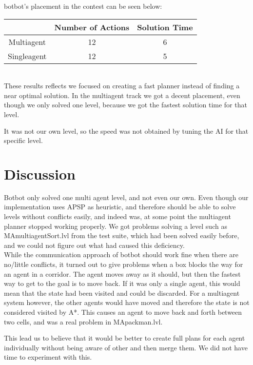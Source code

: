 \documentclass[letterpaper]{article}
\begin{document}
botbot's placement in the contest can be seen below:\\

\begin{tabular}{c|c|c}
 & Number of Actions & Solution Time \\
\hline
Multiagent & 12 & 6 \\
Singleagent & 12 & 5 \\
\end{tabular}\\

These results reflects we focused on creating a fast planner instead of finding
a near optimal solution. In the multiagent track we got a decent placement, even
though we only solved one level, because we got the fastest solution time for that level.

It was not our own level, so the speed was not obtained by tuning the AI for that
specific level.

\section{Discussion}
Botbot only solved one multi agent level, and not even our own. Even though our
implementation uses APSP as heuristic, and therefore should be able to solve
levels without conflicts easily, and indeed was, at some point the multiagent
planner stopped working properly. We got problems solving a level such as MAmultiagentSort.lvl
from the test suite, which had been solved easily before, and we could not
figure out what had caused this deficiency.\\

While the communication approach of botbot should work fine when there are
no/little conflicts, it turned out to give problems when a box blocks the way for
an agent in a corridor. The agent moves away as it should, but then the fastest
way to get to the goal is to move back. If it was only a single agent, this would
mean that the state had been visited and could be discarded. For a multiagent system
however, the other agents would have moved and therefore the state is not considered
visited by A*. This causes an agent to move back and forth between two cells, and
was a real problem in MApackman.lvl.

This lead us to believe that it would be better to create full plans for each agent
individually without being aware of other and then merge them. We did not have time
to experiment with this.\\
\end{document}
